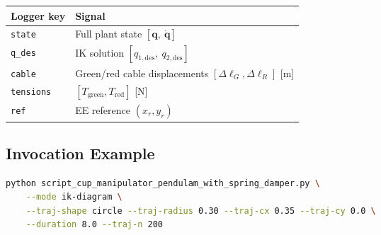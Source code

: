 \documentclass[11pt, a4paper]{article}
\newcommand{\bq}{\bm{q}}
\begin{document}
\begin{center}
\begin{tabular}{ll}
\toprule
Logger key & Signal \\
\midrule
\texttt{state}    & Full plant state $[\bq,\ \dot{\bq}]$ \\
\texttt{q\_des}   & IK solution $[q_{1,\text{des}},\ q_{2,\text{des}}]$ \\
\texttt{cable}    & Green/red cable displacements $[\Delta\ell_G, \Delta\ell_R]$ [m] \\
\texttt{tensions} & $[T_{\text{green}}, T_{\text{red}}]$ [N] \\
\texttt{ref}      & EE reference $(x_r, y_r)$ \\
\bottomrule
\end{tabular}
\end{center}

\subsection{Invocation Example}

\begin{lstlisting}[language=bash]
python script_cup_manipulator_pendulam_with_spring_damper.py \
    --mode ik-diagram \
    --traj-shape circle --traj-radius 0.30 --traj-cx 0.35 --traj-cy 0.0 \
    --duration 8.0 --traj-n 200
\end{lstlisting}
\end{document}

